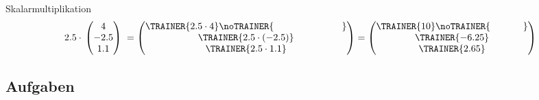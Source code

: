 \begin{beispiel}{Skalarmultiplikation}{}
  $$2.5\cdot{} \begin{pmatrix} 4 \\ -2.5 \\ 1.1 \end{pmatrix} \;
  = \begin{pmatrix}\TRAINER{2.5\cdot{} 4}\noTRAINER{\hspace{25mm}}  \\ \TRAINER{2.5\cdot{} (-2.5)} \\ \TRAINER{2.5\cdot{} 1.1} \end{pmatrix}
  = \begin{pmatrix}\TRAINER{10}\noTRAINER{\hspace{12mm}} \\ \TRAINER{-6.25} \\ \TRAINER{2.65} \end{pmatrix}$$
\end{beispiel}


\subsection*{Aufgaben}
